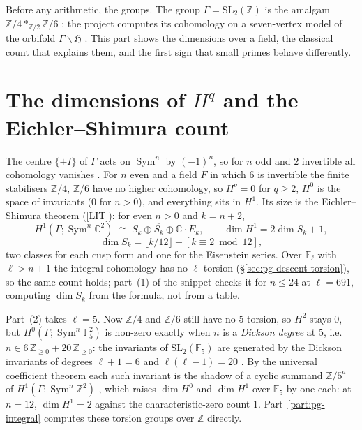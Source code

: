 \documentclass[11pt]{article}
\newcommand{\Z}{\mathbb{Z}}
\newcommand{\F}{\mathbb{F}}
\newcommand{\Fl}{\mathbb{F}_\ell}
\newcommand{\Sym}{\operatorname{Sym}}
\newcommand{\SL}{\mathrm{SL}}
\newcommand{\Ga}{\Gamma}
\newcommand{\LIT}{\textsf{\small[LIT]}}
\begin{document}
Before any arithmetic, the groups. The group $\Ga=\SL_2(\Z)$ is the amalgam $\Z/4\ast_{\Z/2}\Z/6$ {\ttfamily[C,~cl:amalgam]}; the project computes its
cohomology on a seven-vertex model of the orbifold $\Ga\backslash\mathfrak H$ {}. This part shows the dimensions over a
field, the classical count that explains them, and the first sign that small primes behave differently.

\section{The dimensions of \texorpdfstring{$H^{q}$}{H^q} and the Eichler--Shimura count}\label{sec:pg-dims}

The centre $\{\pm I\}$ of $\Ga$ acts on $\Sym^{n}$ by $(-1)^{n}$, so for $n$ odd and $2$ invertible all cohomology vanishes {}.
For $n$ even and a field $F$ in which $6$ is invertible the finite stabilisers $\Z/4$, $\Z/6$ have no higher cohomology, so $H^{q}=0$ for $q\ge2$,
$H^{0}$ is the space of invariants ($0$ for $n>0$), and everything sits in $H^{1}$. Its size is the Eichler--Shimura theorem
{} (\LIT): for even $n>0$ and $k=n+2$,
\[
  H^{1}(\Ga;\Sym^{n}\mathbb C^{2})\;\cong\;S_k\oplus\overline{S_k}\oplus\mathbb C\cdot E_k,\qquad
  \dim H^{1}=2\dim S_k+1,
\]
\[
  \dim S_k=\lfloor k/12\rfloor-[k\equiv2\bmod12],
\]
two classes for each cusp form and one for the Eisenstein series. Over $\Fl$ with $\ell>n+1$ the integral cohomology has no $\ell$-torsion
(\S\ref{sec:pg-descent-torsion}), so the same count holds; part~(1) of the snippet checks it for $n\le24$ at $\ell=691$, computing
$\dim S_k$ from the formula, not from a table.

Part~(2) takes $\ell=5$. Now $\Z/4$ and $\Z/6$ still have no $5$-torsion, so $H^{2}$ stays $0$, but $H^{0}(\Ga;\Sym^{n}\F_5^{2})$ is non-zero
exactly when $n$ is a \emph{Dickson degree} at $5$, i.e.\ $n\in6\,\Z_{\ge0}+20\,\Z_{\ge0}$: the invariants of $\SL_2(\F_5)$ are generated by the
Dickson invariants of degrees $\ell+1=6$ and $\ell(\ell-1)=20$ {}. By the universal coefficient theorem each such
invariant is the shadow of a cyclic summand $\Z/5^{a}$ of $H^{1}(\Ga;\Sym^{n}\Z^{2})$ {\ttfamily[C,~cl:bockstein]}, which raises $\dim H^{0}$
and $\dim H^{1}$ over $\F_5$ by one each: at $n=12$, $\dim H^{1}=2$ against the characteristic-zero count $1$. Part~\ref{part:pg-integral}
computes these torsion groups over $\Z$ directly.
\end{document}
